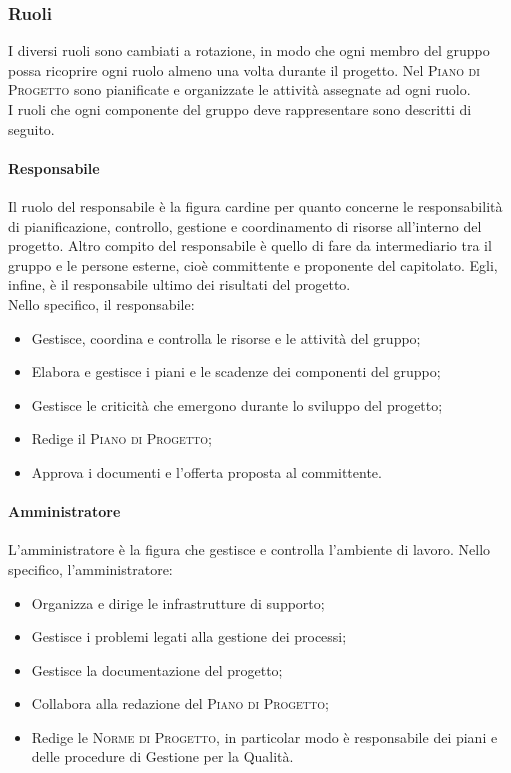\documentclass[../norme-di-progetto.tex]{subfiles}
\begin{document}
\subsubsection{Ruoli}
I diversi ruoli sono cambiati a rotazione, in modo che ogni membro del gruppo possa ricoprire ogni ruolo almeno una volta durante il progetto. Nel \textsc{Piano di Progetto} sono pianificate e organizzate le attività assegnate ad ogni ruolo. \\
I ruoli che ogni componente del gruppo deve rappresentare sono descritti di seguito.
\paragraph{Responsabile}
Il ruolo del responsabile è la figura cardine per quanto concerne le responsabilità di pianificazione, controllo, gestione e coordinamento di risorse all'interno del progetto. Altro compito del responsabile è quello di fare da intermediario tra il gruppo e le persone esterne, cioè committente e proponente del capitolato. Egli, infine, è il responsabile ultimo dei risultati del progetto. \\
Nello specifico, il responsabile:
\begin{itemize}
  \item Gestisce, coordina e controlla le risorse e le attività del gruppo;
  \item Elabora e gestisce i piani e le scadenze dei componenti del gruppo;
  \item Gestisce le criticità che emergono durante lo sviluppo del progetto;
  \item Redige il \textsc{Piano di Progetto};
  \item Approva i documenti e l'offerta proposta al committente.
\end{itemize}

\paragraph{Amministratore}
L'amministratore è la figura che gestisce e controlla l'ambiente di lavoro. Nello specifico, l'amministratore:
\begin{itemize}
  \item Organizza e dirige le infrastrutture di supporto;
  \item Gestisce i problemi legati alla gestione dei processi;
  \item Gestisce la documentazione del progetto;
  \item Collabora alla redazione del \textsc{Piano di Progetto};
  \item Redige le \textsc{Norme di Progetto}, in particolar modo è responsabile dei piani e delle procedure di Gestione per la Qualità.
\end{itemize}
\end{document}
